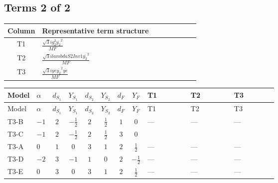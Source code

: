 \documentclass[8pt]{article}
\begin{document}
\begin{landscape}
\subsection*{Terms 2 of 2}
\begin{center}
\begin{tabular}{@{}c >{\raggedright\arraybackslash}p{0.82\linewidth}@{}}
\toprule
Column & Representative term structure \\
\midrule
T1 & \(\displaystyle \frac{\sqrt{3} i g_{2}^{2} \overline{y_{2}}^{2}}{MF}\) \\
\midrule
T2 & \(\displaystyle \frac{\sqrt{3} i lambdaS2Inv1 \overline{y_{2}}^{2}}{MF}\) \\
\midrule
T3 & \(\displaystyle \frac{\sqrt{3} i ye \overline{y_{2}}^{2} \overline{ye}}{MF}\) \\
\midrule
\bottomrule
\end{tabular}
\end{center}
\smallskip
\tiny
\begin{longtable}{@{}llcccccc >{\raggedright\arraybackslash}p{0.21\linewidth} >{\raggedright\arraybackslash}p{0.21\linewidth} >{\raggedright\arraybackslash}p{0.21\linewidth}@{}}
\toprule
Model & $\alpha$ & $d_{S_1}$ & $Y_{S_1}$ & $d_{S_2}$ & $Y_{S_2}$ & $d_F$ & $Y_F$ & T1 & T2 & T3 \\
\midrule
\endfirsthead
\toprule
Model & $\alpha$ & $d_{S_1}$ & $Y_{S_1}$ & $d_{S_2}$ & $Y_{S_2}$ & $d_F$ & $Y_F$ & T1 & T2 & T3 \\
\midrule
\endhead
T3-B & $-1$ & $2$ & $-\frac{1}{2}$ & $2$ & $\frac{1}{2}$ & $1$ & $0$ & --- & --- & --- \\
\midrule
T3-C & $-1$ & $2$ & $-\frac{1}{2}$ & $2$ & $\frac{1}{2}$ & $3$ & $0$ & \scriptsize\adjustbox{max width=\linewidth}{$\begin{gathered} - \frac{\sqrt{3} i g_{2}^{2} \overline{y_{2}}^{2}}{4 MF}\end{gathered}$} & \scriptsize\adjustbox{max width=\linewidth}{$\begin{gathered} - \frac{\sqrt{3} i lambdaS2Inv1 \overline{y_{2}}^{2}}{6 MF}\end{gathered}$} & \scriptsize\adjustbox{max width=\linewidth}{$\begin{gathered} \frac{\sqrt{3} i ye \overline{y_{2}}^{2} \overline{ye}}{12 MF}\end{gathered}$} \\
\midrule
T3-A & $0$ & $1$ & $0$ & $3$ & $1$ & $2$ & $\frac{1}{2}$ & --- & --- & --- \\
\midrule
T3-D & $-2$ & $3$ & $-1$ & $1$ & $0$ & $2$ & $-\frac{1}{2}$ & --- & --- & --- \\
\midrule
T3-E & $0$ & $3$ & $0$ & $3$ & $1$ & $2$ & $\frac{1}{2}$ & --- & --- & --- \\
\midrule
\bottomrule
\end{longtable}
\clearpage

\end{landscape}
\end{document}
